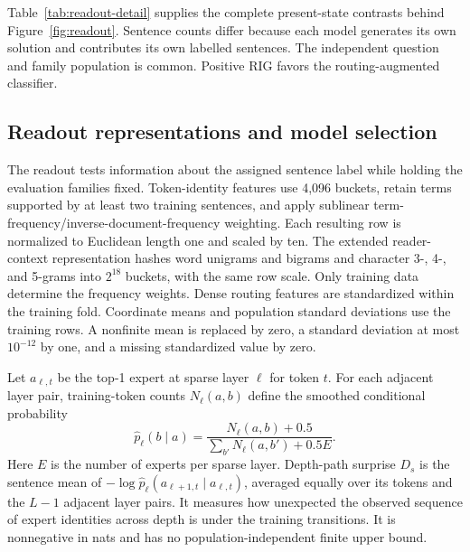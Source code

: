 
Table~\ref{tab:readout-detail} supplies the complete present-state contrasts behind Figure~\ref{fig:readout}.
%
Sentence counts differ because each model generates its own solution and contributes its own labelled sentences.
%
The independent question and family population is common.
%
Positive RIG favors the routing-augmented classifier.
%



\subsection{Readout representations and model selection}
\label{app:readout-features}

The readout tests information about the assigned sentence label while holding the evaluation families fixed.
%
Token-identity features use 4,096 buckets, retain terms supported by at least two training sentences, and apply sublinear term-frequency/inverse-document-frequency weighting.
%
Each resulting row is normalized to Euclidean length one and scaled by ten.
%
The extended reader-context representation hashes word unigrams and bigrams and character 3-, 4-, and 5-grams into $2^{18}$ buckets, with the same row scale.
%
Only training data determine the frequency weights.
%
Dense routing features are standardized within the training fold.
%
Coordinate means and population standard deviations use the training rows.
%
A nonfinite mean is replaced by zero, a standard deviation at most $10^{-12}$ by one, and a missing standardized value by zero.
%

Let $a_{\ell,t}$ be the top-1 expert at sparse layer $\ell$ for token $t$.
%
For each adjacent layer pair, training-token counts $N_\ell(a,b)$ define the smoothed conditional probability
\begin{equation}
\widehat p_\ell(b\mid a)=
\frac{N_\ell(a,b)+0.5}{\sum_{b'}N_\ell(a,b')+0.5E}.
\end{equation}
Here $E$ is the number of experts per sparse layer.
%
Depth-path surprise $D_s$ is the sentence mean of $-\log\widehat p_\ell(a_{\ell+1,t}\mid a_{\ell,t})$, averaged equally over its tokens and the $L-1$ adjacent layer pairs.
%
It measures how unexpected the observed sequence of expert identities across depth is under the training transitions.
%
It is nonnegative in nats and has no population-independent finite upper bound.
%

